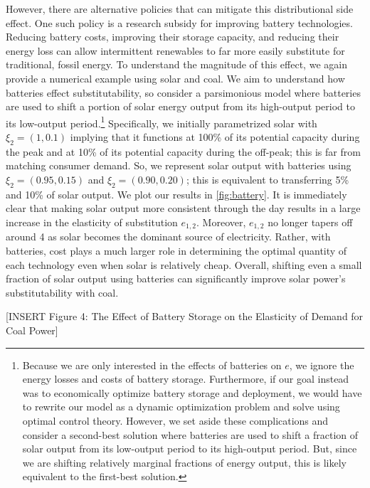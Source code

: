 \documentclass[11pt,a4paper,leqno]{extarticle}
\begin{document}
	However, there are alternative policies that can mitigate this distributional side effect. One such policy is a research subsidy for improving battery technologies. Reducing battery costs, improving their storage capacity, and reducing their  energy loss can allow intermittent renewables to far more easily substitute for traditional, fossil energy. To understand the magnitude of this effect, we again provide a numerical example using solar and coal. We aim to understand how batteries effect substitutability, so consider a parsimonious model where batteries are used to shift a portion of solar energy output from its high-output period to its low-output period.\footnote{Because we are only interested in the effects of batteries on $e$, we ignore the energy losses and costs of battery storage. Furthermore, if our goal instead was to economically optimize battery storage and deployment, we would have to   rewrite our model as a dynamic optimization problem and solve using optimal control theory. However, we set aside these complications and consider a second-best solution where batteries are used to shift a fraction of solar output from its low-output period to its high-output period. But, since we are shifting relatively marginal fractions of energy output, this is likely equivalent to the first-best solution. } Specifically, we initially parametrized solar with $\xi_{2} = (1, 0.1)$ implying that it functions at 100\% of its potential capacity during the peak and at 10\% of its potential capacity during the off-peak; this is far from matching consumer demand. So, we represent solar output with batteries using $\xi_2 = (0.95, 0.15)$ and $\xi_2 = (0.90, 0.20)$; this is equivalent to transferring 5\% and 10\% of solar output.  We plot our results in \autoref{fig:battery}. It is immediately clear that making solar output more consistent through the day results in a large increase in the elasticity of substitution $e_{1,2}$. Moreover,  $e_{1,2}$ no longer tapers off around 4 as solar becomes the dominant source of electricity. Rather, with batteries, cost plays a much larger role in determining the optimal quantity of each technology even when solar is relatively cheap. Overall, shifting even a small fraction of solar output using batteries can significantly improve solar power's substitutability with coal. 
	
	\vspace{0.15in}
	\begin{center}
		[INSERT Figure 4: The Effect of Battery Storage on the  Elasticity of Demand for Coal Power]
	\end{center}
	\vspace{0.15in}
	
\end{document}
